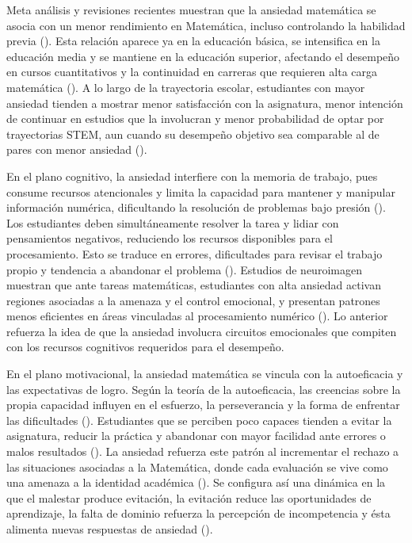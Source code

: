 \documentclass[
  spanish,
  a4paper,
  oneside]{scrbook}
\begin{document}
Meta análisis y revisiones recientes muestran que la ansiedad matemática
se asocia con un menor rendimiento en Matemática, incluso controlando la
habilidad previa ().
Esta relación aparece ya en la educación básica, se intensifica en la
educación media y se mantiene en la educación superior, afectando el
desempeño en cursos cuantitativos y la continuidad en carreras que
requieren alta carga matemática
(). A lo largo
de la trayectoria escolar, estudiantes con mayor ansiedad tienden a
mostrar menor satisfacción con la asignatura, menor intención de
continuar en estudios que la involucran y menor probabilidad de optar
por trayectorias STEM, aun cuando su desempeño objetivo sea comparable
al de pares con menor ansiedad
().

En el plano cognitivo, la ansiedad interfiere con la memoria de trabajo,
pues consume recursos atencionales y limita la capacidad para mantener y
manipular información numérica, dificultando la resolución de problemas
bajo presión (). Los estudiantes deben simultáneamente resolver la tarea y lidiar
con pensamientos negativos, reduciendo los recursos disponibles para el
procesamiento. Esto se traduce en errores, dificultades para revisar el
trabajo propio y tendencia a abandonar el problema
(). Estudios de
neuroimagen muestran que ante tareas matemáticas, estudiantes con alta
ansiedad activan regiones asociadas a la amenaza y el control emocional,
y presentan patrones menos eficientes en áreas vinculadas al
procesamiento numérico ().
Lo anterior refuerza la idea de que la ansiedad involucra circuitos
emocionales que compiten con los recursos cognitivos requeridos para el
desempeño.

En el plano motivacional, la ansiedad matemática se vincula con la
autoeficacia y las expectativas de logro. Según la teoría de la
autoeficacia, las creencias sobre la propia capacidad influyen en el
esfuerzo, la perseverancia y la forma de enfrentar las dificultades
(). Estudiantes que se perciben
poco capaces tienden a evitar la asignatura, reducir la práctica y
abandonar con mayor facilidad ante errores o malos resultados
(). La ansiedad refuerza
este patrón al incrementar el rechazo a las situaciones asociadas a la
Matemática, donde cada evaluación se vive como una amenaza a la
identidad académica (). Se
configura así una dinámica en la que el malestar produce evitación, la
evitación reduce las oportunidades de aprendizaje, la falta de dominio
refuerza la percepción de incompetencia y ésta alimenta nuevas
respuestas de ansiedad ().
\end{document}
